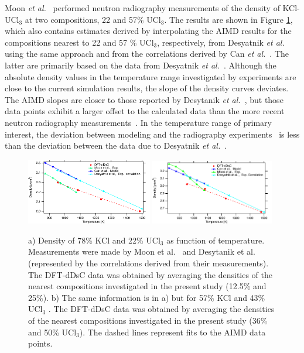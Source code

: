 \documentclass[preprint,3p,10pt,twocolumn,number,sort&compress]{elsarticle}
\begin{document}
Moon \textit{et al.}~\cite{Moon} performed neutron radiography measurements of the density of KCl-UCl$_3$ at two compositions, 22 and 57\% UCl$_3$. The results are shown in Figure \ref{fig:neutron}, which also contains estimates derived by interpolating the AIMD results for the compositions nearest to 22 and 57 \% UCl$_3$, respectively, from Desyatnik \textit{et al.}~\cite{DesyatnikKCl} using the same approach and from the correlations derived by Can \textit{et al.}~\cite{agca2022}. The latter are primarily based on the data from Desyatnik \textit{et al.}~\cite{DesyatnikKCl}. Although the absolute density values in the temperature range investigated by experiments are close to the current simulation results, the slope of the density curves deviates. The AIMD slopes are closer to those reported by Desytanik \textit{et al.}~\cite{DesyatnikKCl}, but those data points exhibit a larger offset to the calculated data than the more recent neutron radiography measurements~\cite{Moon}. In the temperature range of primary interest, the deviation between modeling and the radiography experiments~\cite{Moon} is less than the deviation between the data due to Desyatnik \textit{et al.}~\cite{DesyatnikKCl}.

\begin{figure}[htb]
\centering
\includegraphics[width=0.49\textwidth]{KCl_UCl3_neutron.pdf} \includegraphics[width=0.48\textwidth]{KCl_UCl3_neutronb.pdf}
\caption{a) Density of 78\% KCl and 22\% UCl$_3$ as function of temperature. Measurements were made by Moon et al.~\cite{Moon} and Desytanik et al.~\cite{DesyatnikKCl} (represented by the correlations derived from their measurements). The DFT-dDsC data was obtained by averaging the densities of the nearest compositions investigated in the present study (12.5\% and 25\%). b) The same information is in a) but for 57\% KCl and 43\% UCl$_3$ . The DFT-dDsC data was obtained by averaging the densities of the nearest compositions investigated in the present study (36\% and 50\% UCl$_3$). The dashed lines represent fits to the AIMD data points.}
\label{fig:neutron}
\end{figure}
\end{document}
